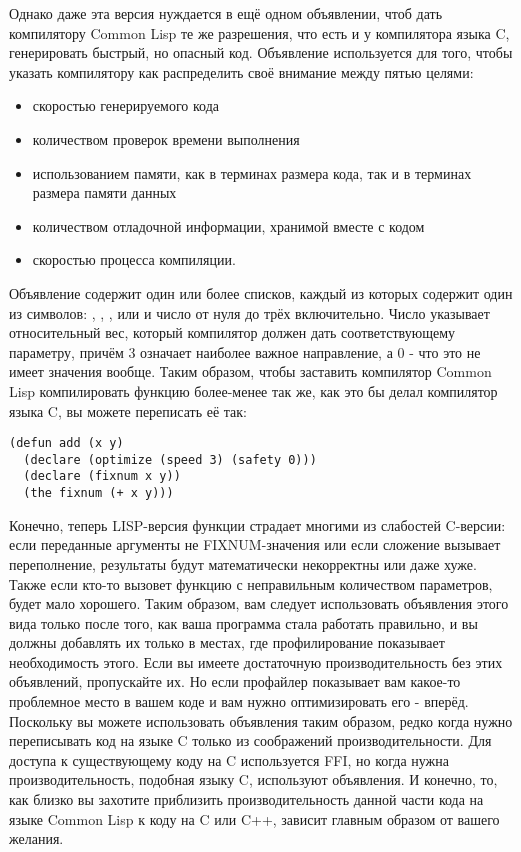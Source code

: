 Однако даже эта версия нуждается в ещё одном объявлении, чтоб дать компилятору Common Lisp
те же разрешения, что есть и у компилятора языка C, генерировать быстрый, но опасный
код. Объявление  используется для того, чтобы указать компилятору как
распределить своё внимание между пятью целями:

\begin{itemize}
\item скоростью генерируемого кода
\item количеством проверок времени выполнения
\item использованием памяти, как в терминах размера кода, так и в терминах размера памяти
  данных
\item количеством отладочной информации, хранимой вместе с кодом
\item скоростью процесса компиляции.
\end{itemize}

Объявление  содержит один или более списков, каждый из которых содержит
один из символов: , , ,  или
 и число от нуля до трёх включительно. Число указывает
относительный вес, который компилятор должен дать соответствующему параметру, причём 3
означает наиболее важное направление, а 0 - что это не имеет значения вообще. Таким
образом, чтобы заставить компилятор Common Lisp компилировать функцию 
более-менее так же, как это бы делал компилятор языка C, вы можете переписать её так:

\begin{lstlisting}
(defun add (x y)
  (declare (optimize (speed 3) (safety 0)))
  (declare (fixnum x y))
  (the fixnum (+ x y)))
\end{lstlisting}

Конечно, теперь LISP-версия функции страдает многими из слабостей C-версии: если
переданные аргументы не FIXNUM-значения или если сложение вызывает переполнение,
результаты будут математически некорректны или даже хуже. Также если кто-то вызовет
функцию  с неправильным количеством параметров, будет мало хорошего. Таким
образом, вам следует использовать объявления этого вида только после того, как ваша
программа стала работать правильно, и вы должны добавлять их только в местах, где
профилирование показывает необходимость этого. Если вы имеете достаточную
производительность без этих объявлений, пропускайте их. Но если профайлер показывает вам
какое-то проблемное место в вашем коде и вам нужно оптимизировать его - вперёд. Поскольку
вы можете использовать объявления таким образом, редко когда нужно переписывать код на
языке C только из соображений производительности. Для доступа к существующему коду на C
используется FFI, но когда нужна производительность, подобная языку C, используют
объявления. И конечно, то, как близко вы захотите приблизить производительность данной
части кода на языке Common Lisp к коду на C или C++, зависит главным образом от вашего
желания.

